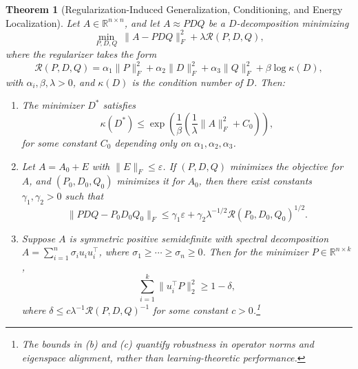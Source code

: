 \documentclass[10pt,a4paper]{article}
\newtheorem{theorem}{\bf Theorem}[section]
\begin{document}
\begin{theorem}[Regularization-Induced Generalization, Conditioning, and Energy Localization]
\label{thm:triple}
Let \( A \in \mathbb{R}^{n \times n} \), and let \( A \approx P D Q \) be a \( D \)-decomposition minimizing
\[
\min_{P, D, Q} \ \|A - P D Q\|_F^2 + \lambda \mathcal{R}(P, D, Q),
\]
where the regularizer takes the form
\[
\mathcal{R}(P, D, Q) = \alpha_1 \|P\|_F^2 + \alpha_2 \|D\|_F^2 + \alpha_3 \|Q\|_F^2 + \beta \log \kappa(D),
\]
with \( \alpha_i, \beta, \lambda > 0 \), and \( \kappa(D) \) is the condition number of \( D \). Then:
\begin{enumerate}
    \item[\textbf{(a)}] The minimizer \( D^* \) satisfies
    \[
    \kappa(D^*) \leq \exp\left( \frac{1}{\beta} \left( \frac{1}{\lambda} \|A\|_F^2 + C_0 \right) \right),
    \]
    for some constant \( C_0 \) depending only on \( \alpha_1, \alpha_2, \alpha_3 \).
    
    \item[\textbf{(b)}] Let \( A = A_0 + E \) with \( \|E\|_F \leq \varepsilon \). If \( (P, D, Q) \) minimizes the objective for \( A \), and \( (P_0, D_0, Q_0) \) minimizes it for \( A_0 \), then there exist constants \( \gamma_1, \gamma_2 > 0 \) such that
    \[
    \|P D Q - P_0 D_0 Q_0\|_F \leq \gamma_1 \varepsilon + \gamma_2 \lambda^{-1/2} \mathcal{R}(P_0, D_0, Q_0)^{1/2}.
    \]
    
    \item[\textbf{(c)}] Suppose \( A \) is symmetric positive semidefinite with spectral decomposition \( A = \sum_{i=1}^n \sigma_i u_i u_i^\top \), where \( \sigma_1 \geq \cdots \geq \sigma_n \geq 0 \). Then for the minimizer \( P \in \mathbb{R}^{n \times k} \),
    \[
    \sum_{i=1}^k \|u_i^\top P\|_2^2 \geq 1 - \delta,
    \]
    where \( \delta \leq c \lambda^{-1} \mathcal{R}(P, D, Q)^{-1} \) for some constant \( c > 0 \).\footnote{The bounds in (b) and (c) quantify robustness in operator norms and eigenspace alignment, rather than learning-theoretic performance.}
\end{enumerate}
\end{theorem}
\end{document}
